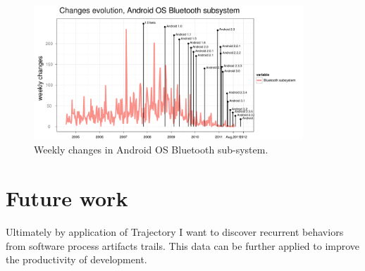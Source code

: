 \documentclass[a4paper,10pt]{article}
\numberwithin{equation}{subsection}
\begin{document}
\begin{figure}[htb]
  \centering
  \includegraphics[width=0.9\textwidth]{figures/bluetooth_changes.pdf}
  \caption{Weekly changes in Android OS Bluetooth sub-system.}
  \label{fig:bluetooth_changes}
\end{figure}



\section{Future work}
Ultimately by application of Trajectory I want to discover recurrent behaviors from
software process artifacts trails. This data can be further applied to improve the
productivity of development.
\end{document}
